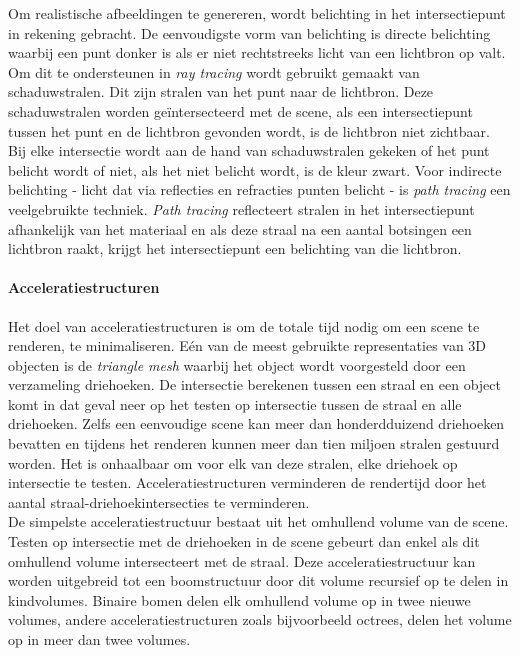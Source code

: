 Om realistische afbeeldingen te genereren, wordt belichting in het intersectiepunt in rekening gebracht. De eenvoudigste vorm van belichting is directe belichting waarbij een punt donker is als er niet rechtstreeks licht van een lichtbron op valt. Om dit te ondersteunen in \textit{ray tracing} wordt gebruikt gemaakt van schaduwstralen. Dit zijn stralen van het punt naar de lichtbron. Deze schaduwstralen worden geïntersecteerd met de scene, als een intersectiepunt tussen het punt en de lichtbron gevonden wordt, is de lichtbron niet zichtbaar. Bij elke intersectie wordt aan de hand van schaduwstralen gekeken of het punt belicht wordt of niet, als het niet belicht wordt, is de kleur zwart. Voor indirecte belichting - licht dat via reflecties en refracties punten belicht - is \textit{path tracing} \cite{kajiya1986rendering} een veelgebruikte techniek. \textit{Path tracing} reflecteert stralen in het intersectiepunt afhankelijk van het materiaal en als deze straal na een aantal botsingen een lichtbron raakt, krijgt het intersectiepunt een belichting van die lichtbron.    

\paragraph{Acceleratiestructuren}
Het doel van acceleratiestructuren is om de totale tijd nodig om een scene te renderen, te minimaliseren.
Eén van de meest gebruikte representaties van 3D objecten is de \textit{triangle mesh} waarbij het object wordt voorgesteld door een verzameling driehoeken.
De intersectie berekenen tussen een straal en een object komt in dat geval neer op het testen op intersectie tussen de straal en alle driehoeken.
Zelfs een eenvoudige scene kan meer dan honderdduizend driehoeken bevatten en tijdens het renderen kunnen meer dan tien miljoen stralen gestuurd worden.
Het is onhaalbaar om voor elk van deze stralen, elke driehoek op intersectie te testen.
Acceleratiestructuren verminderen de rendertijd door het aantal straal-driehoekintersecties te verminderen.\\

De simpelste acceleratiestructuur bestaat uit het omhullend volume van de scene.
Testen op intersectie met de driehoeken in de scene gebeurt dan enkel als dit omhullend volume intersecteert met de straal.
Deze acceleratiestructuur kan worden uitgebreid tot een boomstructuur door dit volume recursief op te delen in kindvolumes.
Binaire bomen delen elk omhullend volume op in twee nieuwe volumes, andere acceleratiestructuren zoals bijvoorbeeld octrees, delen het volume op in meer dan twee volumes.
\\

